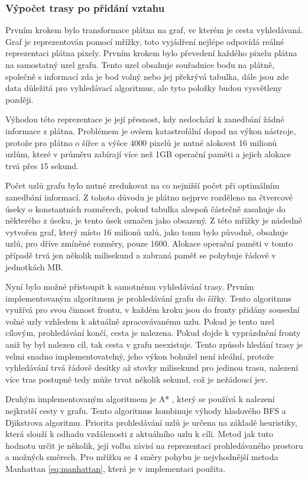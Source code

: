 \documentclass[czech,bachelor,public,dept460,male,oneside]{diploma}
\begin{document}
		\subsubsection{Výpočet trasy po přidání vztahu} \label{secAStar}
		Prvním krokem bylo transformace plátna na graf, ve kterém je cesta vyhledávaná. Graf je reprezentován pomocí mřížky, toto vyjádření nejlépe odpovídá reálné reprezentaci plátna pixely. Prvním krokem bylo převedení každého pixelu plátna na samostatný uzel grafu. Tento uzel obsahuje souřadnice bodu na plátně, společně s informací zda je bod volný nebo jej překrývá tabulka, dále jsou zde data důležitá pro vyhledávací algoritmus, ale tyto položky budou vysvětleny později.
		
		Výhodou této reprezentace je její přesnost, kdy nedochází k zanedbání žádné informace z plátna. Problémem je ovšem katastrofální dopad na výkon nástroje, protože pro plátno o šířce a výšce 4000 pixelů je nutné alokovat 16 milionů uzlům, které v průměru zabírají více než 1GB operační paměti a jejich alokace trvá přes 15 sekund. 
		
		Počet uzlů grafu bylo nutné zredukovat na co nejnižší počet při optimálním zanedbání informací. Z tohoto důvodu je plátno nejprve rozděleno na čtvercové úseky o konstantních rozměrech, pokud tabulka alespoň částečně zasahuje do některého z úseku, je tento úsek označen jako obsazený. Z této mřížky je následně vytvořen graf, který místo 16 milionů uzlů, jako tomu bylo původně, obsahuje uzlů, pro dříve zmíněné rozměry, pouze 1600. Alokace operační paměti v tomto případě trvá jen několik milisekund a zabraná paměť se pohybuje řádově v jednotkách MB.
		
		Nyní bylo možné přistoupit k samotnému vyhledávání trasy. Prvním implementovaným algoritmem je prohledávání grafu do šířky. Tento algoritmus využívá pro svou činnost frontu, v každém kroku jsou do fronty přidány sousední volné uzly vzhledem k aktuálně zpracovávanému uzlu. Pokud je tento uzel cílovým, prohledávání končí, cesta je nalezena. Pokud dojde k vyprázdnění fronty aniž by byl nalezen cíl, tak cesta v grafu neexistuje. Tento způsob hledání trasy je velmi snadno implementovatelný, jeho výkon bohužel není ideální, protože vyhledávání trvá řádově desítky až stovky milisekund pro jedinou trasu, nalezení více tras postupně tedy může trvat několik sekund, což je nežádoucí jev.
		
		Druhým implementovaným algoritmem je A* \cite{aStar}, který se používá k nalezení nejkratší cesty v grafu. Tento algoritmus kombinuje výhody hladového BFS a Djikstrova algoritmu. Priorita prohledávání uzlů je určena na základě heuristiky, která slouží k odhadu vzdálenosti z aktuálního uzlu k cíli. Metod jak tuto hodnotu určit je několik, její volba závisí na reprezentaci prohledávaného prostoru a možných směrech. Pro mřížku se 4 směry pohybu je nejvhodnější metoda Manhattan \ref{eq:manhattan}, která je v implementaci použita.
		
\end{document}
